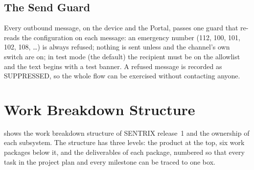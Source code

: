 \subsection{The Send Guard}
Every outbound message, on the device and the Portal, passes one guard that re-reads the configuration on each message: an emergency number (112, 100, 101, 102, 108, \ldots) is always refused; nothing is sent unless  and the channel's own switch are on; in test mode (the default) the recipient must be on the allowlist and the text begins with a test banner. A refused message is recorded as SUPPRESSED, so the whole flow can be exercised without contacting anyone.

\section{Work Breakdown Structure}
\label{sec:wbs}
 shows the work breakdown structure of SENTRIX release~1 and  the ownership of each subsystem. The structure has three levels: the product at the top, six work packages below it, and the deliverables of each package, numbered so that every task in the project plan and every milestone can be traced to one box.
